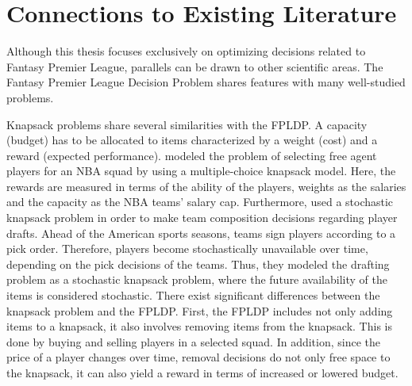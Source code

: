 \section{Connections to Existing Literature}\label{Other_Relevant_Research}

Although this thesis focuses exclusively on optimizing decisions related to Fantasy Premier League, parallels can be drawn to other scientific areas. The Fantasy Premier League Decision Problem shares features with many well-studied problems.  

\newpar

Knapsack problems share several similarities with the FPLDP. A capacity (budget) has to be allocated to items characterized by a weight (cost) and a reward (expected performance). \cite{Kirshner} modeled the problem of selecting free agent players for an NBA squad by using a multiple-choice knapsack model. Here, the rewards are measured in terms of the ability of the players, weights as the salaries and the capacity as the NBA teams' salary cap. Furthermore, \cite{Gibson} used a stochastic knapsack problem in order to make team composition decisions regarding player drafts. Ahead of the American sports seasons, teams sign players according to a pick order. Therefore, players become stochastically unavailable over time, depending on the pick decisions of the teams. Thus, they modeled the drafting problem as a stochastic knapsack problem, where the future availability of the items is considered stochastic. There exist significant differences between the knapsack problem and the FPLDP. First, the FPLDP includes not only adding items to a knapsack, it also involves removing items from the knapsack. This is done by buying and selling players in a selected squad. In addition, since the price of a player changes over time, removal decisions do not only free space to the knapsack, it can also yield a reward in terms of increased or lowered budget.

\newpar


